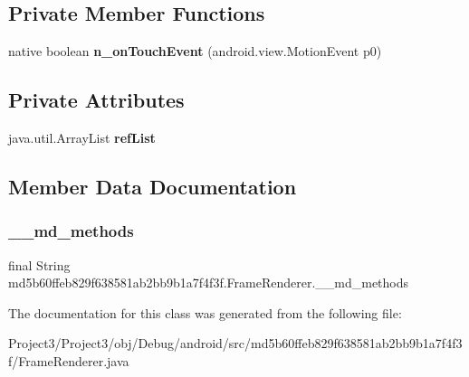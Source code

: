 \subsection*{Private Member Functions}
\begin{DoxyCompactItemize}
\item 
\mbox{\label{classmd5b60ffeb829f638581ab2bb9b1a7f4f3f_1_1FrameRenderer_af5975cde0cd3d4980507d2033988a61d}} 
native boolean {\bfseries n\+\_\+on\+Touch\+Event} (android.\+view.\+Motion\+Event p0)
\end{DoxyCompactItemize}
\subsection*{Private Attributes}
\begin{DoxyCompactItemize}
\item 
\mbox{\label{classmd5b60ffeb829f638581ab2bb9b1a7f4f3f_1_1FrameRenderer_a21cc95191ee8ae27b886228f196f3939}} 
java.\+util.\+Array\+List {\bfseries ref\+List}
\end{DoxyCompactItemize}


\subsection{Member Data Documentation}
\mbox{\label{classmd5b60ffeb829f638581ab2bb9b1a7f4f3f_1_1FrameRenderer_ad51663e7802471a9ec8a28e818f4c43f}} 
\subsubsection{\texorpdfstring{\+\_\+\+\_\+md\+\_\+methods}{\_\_md\_methods}}
{\footnotesize\ttfamily final String md5b60ffeb829f638581ab2bb9b1a7f4f3f.\+Frame\+Renderer.\+\_\+\+\_\+md\+\_\+methods\hspace{0.3cm}{\ttfamily [static]}}



The documentation for this class was generated from the following file\+:\begin{DoxyCompactItemize}
\item 
Project3/\+Project3/obj/\+Debug/android/src/md5b60ffeb829f638581ab2bb9b1a7f4f3f/Frame\+Renderer.\+java\end{DoxyCompactItemize}
